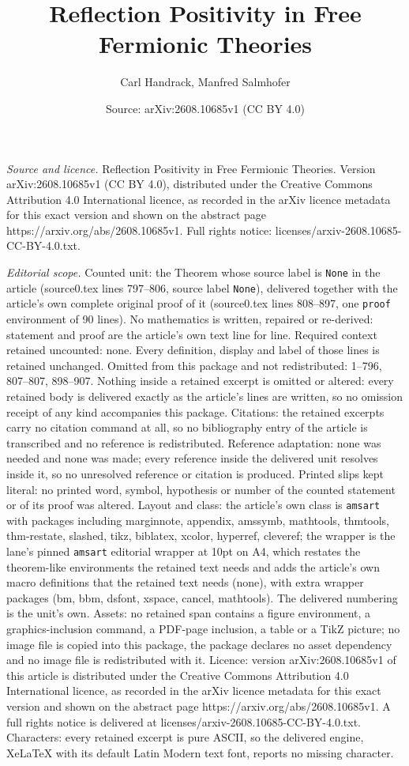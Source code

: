\documentclass[10pt,a4paper]{amsart}
\title[Reflection Positivity in Free Fermionic Theories]{Reflection Positivity in Free Fermionic Theories}
\author{Carl Handrack, Manfred Salmhofer}
\date{Source: arXiv:2608.10685v1 (CC BY 4.0)}
\begin{document}
\maketitle

\noindent\emph{Source and licence.} Reflection Positivity in Free Fermionic Theories. Version arXiv:2608.10685v1 (CC BY 4.0), distributed under the Creative Commons Attribution 4.0 International licence, as recorded in the arXiv licence metadata for this exact version and shown on the abstract page https://arxiv.org/abs/2608.10685v1. Full rights notice: licenses/arxiv-2608.10685-CC-BY-4.0.txt.\par\smallskip

\noindent\textit{Editorial scope.} Counted unit: the Theorem whose source label is \texttt{None} in the article (source0.tex lines 797--806, source label \texttt{None}), delivered together with the article's own complete original proof of it (source0.tex lines 808--897, one \texttt{proof} environment of 90 lines). No mathematics is written, repaired or re-derived: statement and proof are the article's own text line for line. Required context retained uncounted: none. Every definition, display and label of those lines is retained unchanged. Omitted from this package and not redistributed: 1--796, 807--807, 898--907. Nothing inside a retained excerpt is omitted or altered: every retained body is delivered exactly as the article's lines are written, so no omission receipt of any kind accompanies this package. Citations: the retained excerpts carry no citation command at all, so no bibliography entry of the article is transcribed and no reference is redistributed. Reference adaptation: none was needed and none was made; every reference inside the delivered unit resolves inside it, so no unresolved reference or citation is produced. Printed slips kept literal: no printed word, symbol, hypothesis or number of the counted statement or of its proof was altered. Layout and class: the article's own class is \texttt{amsart} with packages including marginnote, appendix, amssymb, mathtools, thmtools, thm-restate, slashed, tikz, biblatex, xcolor, hyperref, cleveref; the wrapper is the lane's pinned \texttt{amsart} editorial wrapper at 10pt on A4, which restates the theorem-like environments the retained text needs and adds the article's own macro definitions that the retained text needs (none), with extra wrapper packages (bm, bbm, dsfont, xspace, cancel, mathtools). The delivered numbering is the unit's own. Assets: no retained span contains a figure environment, a graphics-inclusion command, a PDF-page inclusion, a table or a TikZ picture; no image file is copied into this package, the package declares no asset dependency and no image file is redistributed with it. Licence: version arXiv:2608.10685v1 of this article is distributed under the Creative Commons Attribution 4.0 International licence, as recorded in the arXiv licence metadata for this exact version and shown on the abstract page https://arxiv.org/abs/2608.10685v1. A full rights notice is delivered at licenses/arxiv-2608.10685-CC-BY-4.0.txt. Characters: every retained excerpt is pure ASCII, so the delivered engine, XeLaTeX with its default Latin Modern text font, reports no missing character.
\end{document}
